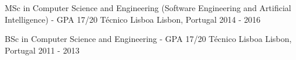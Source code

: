 
\begin{cventries}
  \cventryShort
    {MSc in Computer Science and Engineering (Software Engineering and Artificial Intelligence) - GPA 17/20}
    {Técnico Lisboa}
    {Lisbon, Portugal}
    {2014 - 2016}

  \cventryShort
    {BSc in Computer Science and Engineering - GPA 17/20}
    {Técnico Lisboa}
    {Lisbon, Portugal}
    {2011 - 2013}
\end{cventries}
